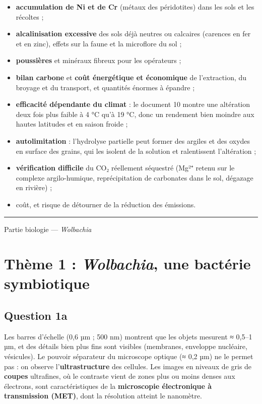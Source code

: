 \documentclass[11pt,a4paper]{article}
\providecommand{\tightlist}{\setlength{\itemsep}{0pt}\setlength{\parskip}{0pt}}
\begin{document}
\begin{itemize}
\tightlist
\item
  \textbf{accumulation de Ni et de Cr} (métaux des péridotites) dans les sols et les récoltes ;
\item
  \textbf{alcalinisation excessive} des sols déjà neutres ou calcaires (carences en fer et en zinc), effets sur la faune et la microflore du sol ;
\item
  \textbf{poussières} et minéraux fibreux pour les opérateurs ;
\item
  \textbf{bilan carbone} et \textbf{coût énergétique et économique} de l'extraction, du broyage et du transport, et quantités énormes à épandre ;
\item
  \textbf{efficacité dépendante du climat} : le document 10 montre une altération deux fois plus faible à 4 °C qu'à 19 °C, donc un rendement bien moindre aux hautes latitudes et en saison froide ;
\item
  \textbf{autolimitation} : l'hydrolyse partielle peut former des argiles et des oxydes en surface des grains, qui les isolent de la solution et ralentissent l'altération ;
\item
  \textbf{vérification difficile} du CO₂ réellement séquestré (Mg²⁺ retenu sur le complexe argilo-humique, reprécipitation de carbonates dans le sol, dégazage en rivière) ;
\item
  coût, et risque de détourner de la réduction des émissions.
\end{itemize}

\begin{center}\rule{0.5\linewidth}{0.5pt}\end{center}

Partie biologie --- \emph{Wolbachia}

\hypertarget{thuxe8me-1-wolbachia-une-bactuxe9rie-symbiotique}{%
\section{\texorpdfstring{Thème 1 : \emph{Wolbachia}, une bactérie symbiotique}{Thème 1 : Wolbachia, une bactérie symbiotique}}\label{thuxe8me-1-wolbachia-une-bactuxe9rie-symbiotique}}

\hypertarget{question-1a}{%
\subsection{Question 1a}\label{question-1a}}

Les barres d'échelle (0,6 µm ; 500 nm) montrent que les objets mesurent ≈ 0,5--1 µm, et des détails bien plus fins sont visibles (membranes, enveloppe nucléaire, vésicules). Le pouvoir séparateur du microscope optique (≈ 0,2 µm) ne le permet pas : on observe l'\textbf{ultrastructure} des cellules. Les images en niveaux de gris de \textbf{coupes} ultrafines, où le contraste vient de zones plus ou moins denses aux électrons, sont caractéristiques de la \textbf{microscopie électronique à transmission (MET)}, dont la résolution atteint le nanomètre.
\end{document}
